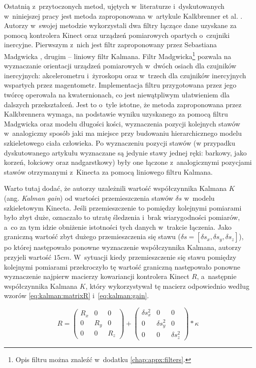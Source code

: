 Ostatnią z~przytoczonych metod, ujętych w~literaturze i~dyskutowanych w~niniejszej pracy jest metoda zaproponowana w~artykule Kalkbrenner et al. \cite{Kalkbrenner2014}. Autorzy w~swojej metodzie wykorzystali dwa filtry łączące dane uzyskane za pomocą kontrolera Kinect oraz urządzeń pomiarowych opartych o~czujniki inercyjne. Pierwszym z~nich jest filtr zaproponowany przez Sebastiana Madgwicka \cite{Kalkbrenner2014}, drugim -- liniowy filtr Kalmana. Filtr Madgwicka\footnote{Opis filtru można znaleźć w~dodatku \ref{chap:appx:filters}.} pozwala na wyznaczanie orientacji urządzeń pomiarowych w~dwóch osiach dla czujników inercyjnych: akcelerometru i~żyroskopu oraz w~trzech dla czujników inercyjnych wspartych przez magentometr. Implementacja filtru przygotowana przez jego twórcę operowała na kwaternionach, co jest niewątpliwym ułatwieniem dla dalszych przekształceń. Jest to o~tyle istotne, że metoda zaproponowana przez Kalkbrennera wymaga, na podstawie wyniku uzyskanego za pomocą filtru Madgwicka oraz modelu długości kości, wyznaczenia pozycji kolejnych stawów  w~analogiczny sposób jaki ma miejsce przy budowaniu hierarchicznego modelu szkieletowego ciała człowieka. Po wyznaczeniu pozycji stawów (w przypadku dyskutowanego artykułu wyznaczane są jedynie stawy jednej ręki: barkowy, jako korzeń, łokciowy oraz nadgarstkowy) były one łączone z~analogicznymi pozycjami stawów otrzymanymi z~Kinecta za pomocą liniowego filtru Kalmana. 
																																																			
Warto tutaj dodać, że autorzy uzależnili wartość współczynnika Kalmana $K$ (ang. \emph{Kalman gain}) od wartości przemieszczenia stawów $\delta s$ w~modelu szkieletowym Kinecta. Jeśli przemieszczenie to pomiędzy kolejnymi pomiarami było zbyt duże, oznaczało to utratę śledzenia i~brak wiarygodności pomiarów, a~co za tym idzie obniżenie istotności tych danych w~trakcie łączenia. Jako graniczną wartość zbyt dużego przemieszczenia się stawu ($\delta s = [\delta s_x, \delta s_y, \delta s_z]$), po której następowało ponowne wyznaczenie współczynnika Kalmana, autorzy przyjeli wartość $15cm$. W~sytuacji kiedy przemieszczenie się stawu pomiędzy kolejnymi pomiarami przekroczyło tę wartość graniczną następowało ponowne wyznaczenie najpierw macierzy kowariancji kontrolera Kinect $R$, a~następnie współczynnika Kalmana $K$, który wykorzystywał tę macierz odpowiednio według wzorów \ref{eq:kalman:matrixR} i~\ref{eq:kalman:gain}.
																																																	
\begin{equation}
	R = 
	\begin{pmatrix}
		R_x & 0   & 0   \\
		0   & R_y & 0   \\
		0   & 0   & R_z 
	\end{pmatrix} +
	\begin{pmatrix}
		\delta s_x^2 & 0            & 0            \\
		0            & \delta s_y^2 & 0            \\
		0            & 0            & \delta s_z^2 
	\end{pmatrix} * \kappa
	\label{eq:kalman:matrixR}
\end{equation}
																																																			
